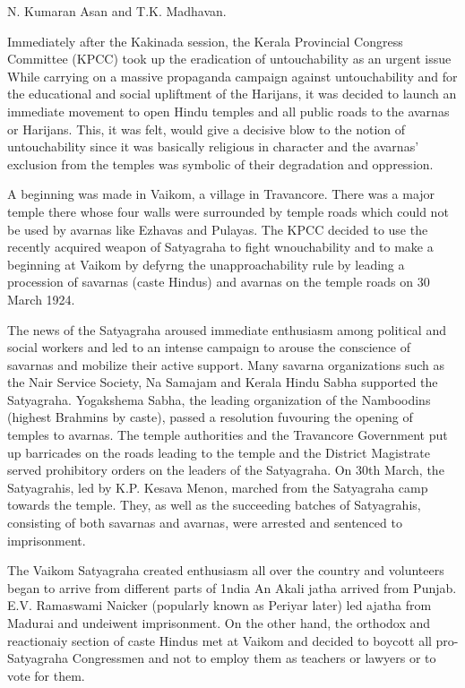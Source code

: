 \begin{multicols}{2}
N. Kumaran Asan and T.K. Madhavan.

Immediately after the Kakinada session, the Kerala Provincial Congress Committee (KPCC) took up the eradication of untouchability as an urgent issue While carrying on a massive propaganda campaign against untouchability and for the educational and social upliftment of the Harijans, it was decided to launch an immediate movement to open Hindu temples and all public roads to the avarnas or Harijans. This, it was felt, would give a decisive blow to the notion of untouchability since it was basically religious in character and the avarnas' exclusion from the temples was symbolic of their degradation and oppression.

A beginning was made in Vaikom, a village in Travancore. There was a major temple there whose four walls were surrounded by temple roads which could not be used by avarnas like Ezhavas and Pulayas. The KPCC decided to use the recently acquired weapon of Satyagraha to fight wnouchability and to make a beginning at Vaikom by defyrng the unapproachability rule by leading a procession of savarnas (caste Hindus) and avarnas on the temple roads on 30 March 1924.

The news of the Satyagraha aroused immediate enthusiasm among political and social workers and led to an intense campaign to arouse the conscience of savarnas and mobilize their active support. Many savarna organizations such as the Nair Service Society, Na Samajam and Kerala Hindu Sabha supported the Satyagraha. Yogakshema Sabha, the leading organization of the Namboodins (highest Brahmins by caste), passed a resolution fuvouring the opening of temples to avarnas. The temple authorities and the Travancore Government put up barricades on the roads leading to the temple and the District Magistrate served prohibitory orders on the leaders of the Satyagraha. On 30th March, the Satyagrahis, led by K.P. Kesava Menon, marched from the Satyagraha camp towards the temple. They, as well as the succeeding batches of Satyagrahis, consisting of both savarnas and avarnas, were arrested and sentenced to imprisonment.

The Vaikom Satyagraha created enthusiasm all over the country and volunteers began to arrive from different parts of 1ndia An Akali jatha arrived from Punjab. E.V. Ramaswami Naicker (popularly known as Periyar later) led ajatha from Madurai and undeiwent imprisonment. On the other hand, the orthodox and reactionaiy section of caste Hindus met at Vaikom and decided to boycott all pro-Satyagraha Congressmen and not to employ them as teachers or lawyers or to vote for them.


\end{multicols}
